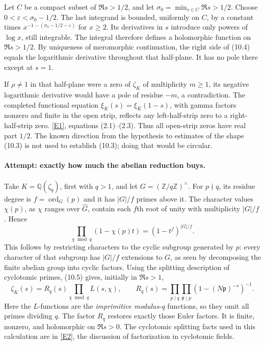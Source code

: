 \documentclass[11pt,a4paper]{article}
\newcommand{\Z}{\mathbb{Z}}
\newcommand{\Q}{\mathbb{Q}}
\newcommand{\eref}[2]{\hyperlink{extra:#1:#2}{[E#2]}}
\begin{document}
Let $C$ be a compact subset of $\Re s>1/2$, and let
$\sigma_0=\min_{s\in C}\Re s>1/2$. Choose
$0<\varepsilon<\sigma_0-1/2$. The last integrand is bounded, uniformly
on $C$, by a constant times
$x^{-1-(\sigma_0-1/2-\varepsilon)}$ for $x\geq2$.
Its derivatives in $s$ introduce only powers of $\log x$, still
integrable. The integral therefore defines a holomorphic function on
$\Re s>1/2$. By uniqueness of meromorphic continuation, the right side
of (10.4) equals the logarithmic derivative throughout that half-plane.
It has no pole there except at $s=1$.

If $\rho\ne1$ in that half-plane were a zero of $\zeta_K$ of multiplicity
$m\geq1$, its negative logarithmic derivative would have a pole of
residue $-m$, a contradiction. The completed functional equation
$\xi_K(s)=\xi_K(1-s)$, with gamma factors nonzero and finite in the
open strip, reflects any left-half-strip zero to a right-half-strip
zero. \eref{statement}{1}, equations (2.1)--(2.3).
Thus all open-strip zeros have real part $1/2$. The known direction
from the hypothesis to estimates of the shape (10.3) is not used to
establish (10.3); doing that would be circular.

\paragraph{Attempt: exactly how much the abelian reduction buys.}
Take $K=\Q(\zeta_q)$, first with $q>1$, and let
$G=(\Z/q\Z)^\times$. For $p\nmid q$, its residue degree is
$f=\operatorname{ord}_G(p)$ and it has $|G|/f$ primes above it.
The character values $\chi(p)$, as $\chi$ ranges over $\widehat G$,
contain each $f$th root of unity with multiplicity $|G|/f$. Hence
\[
 \prod_{\chi\bmod q}(1-\chi(p)t)
       =(1-t^f)^{|G|/f}. \tag{10.5}
\]
This follows by restricting characters to the cyclic subgroup generated
by $p$: every character of that subgroup has $|G|/f$ extensions to
$G$, as seen by decomposing the finite abelian group into cyclic factors.
Using the splitting description of cyclotomic primes, (10.5) gives,
initially in $\Re s>1$,
\[
 \zeta_K(s)=R_q(s)\prod_{\chi\bmod q}L(s,\chi),\qquad
 R_q(s)=\prod_{p\mid q}\prod_{\mathfrak p\mid p}
              (1-(N\mathfrak p)^{-s})^{-1}. \tag{10.6}
\]
Here the $L$-functions are the \emph{imprimitive modulus-$q$} functions,
so they omit all primes dividing $q$. The factor $R_q$ restores exactly
those Euler factors. It is finite, nonzero, and holomorphic on $\Re s>0$.
The cyclotomic splitting facts used in this calculation are in
\eref{statement}{2}, the discussion of factorization in cyclotomic fields.
\end{document}
